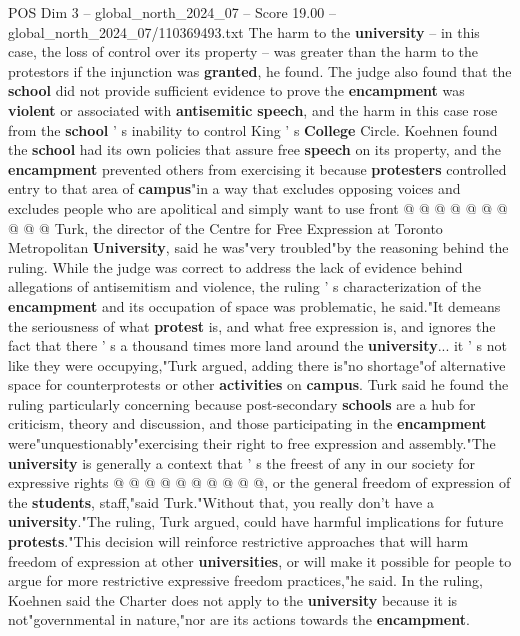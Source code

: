 \begin{textsample}{POS Dim 3 – global\_north\_2024\_07 – Score 19.00 – global\_north\_2024\_07/110369493.txt}
The harm to the \textbf{university} -- in this case, the loss of control over its property -- was greater than the harm to the protestors if the injunction was \textbf{granted}, he found.
The judge also found that the \textbf{school} did not provide sufficient evidence to prove the \textbf{encampment} was \textbf{violent} or associated with \textbf{antisemitic} \textbf{speech}, and the harm in this case rose from the \textbf{school} ' s inability to control King ' s \textbf{College} Circle.
Koehnen found the \textbf{school} had its own policies that assure free \textbf{speech} on its property, and the \textbf{encampment} prevented others from exercising it because \textbf{protesters} controlled entry to that area of \textbf{campus}"in a way that excludes opposing voices and excludes people who are apolitical and simply want to use front @ @ @ @ @ @ @ @ @ @ Turk, the director of the Centre for Free Expression at Toronto Metropolitan \textbf{University}, said he was"very troubled"by the reasoning behind the ruling.
While the judge was correct to address the lack of evidence behind allegations of antisemitism and violence, the ruling ' s characterization of the \textbf{encampment} and its occupation of space was problematic, he said."It demeans the seriousness of what \textbf{protest} is, and what free expression is, and ignores the fact that there ' s a thousand times more land around the \textbf{university}... it ' s not like they were occupying,"Turk argued, adding there is"no shortage"of alternative space for counterprotests or other \textbf{activities} on \textbf{campus}.
Turk said he found the ruling particularly concerning because post-secondary \textbf{schools} are a hub for criticism, theory and discussion, and those participating in the \textbf{encampment} were"unquestionably"exercising their right to free expression and assembly."The \textbf{university} is generally a context that ' s the freest of any in our society for expressive rights @ @ @ @ @ @ @ @ @ @, or the general freedom of expression of the \textbf{students}, staff,"said Turk."Without that, you really don't have a \textbf{university}."The ruling, Turk argued, could have harmful implications for future \textbf{protests}."This decision will reinforce restrictive approaches that will harm freedom of expression at other \textbf{universities}, or will make it possible for people to argue for more restrictive expressive freedom practices,"he said.
In the ruling, Koehnen said the Charter does not apply to the \textbf{university} because it is not"governmental in nature,"nor are its actions towards the \textbf{encampment}.

\end{textsample}

